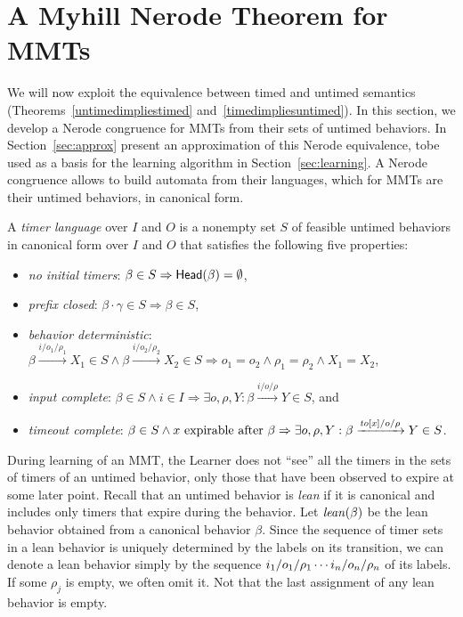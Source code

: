 \section{A Myhill Nerode Theorem for MMTs}
\label{sec:nerode}
\label{sec:bj-nerode}

We will now exploit the equivalence between timed and untimed semantics
(Theorems~\ref{untimedimpliestimed} and~\ref{timedimpliesuntimed}).
In this section, we develop a Nerode congruence for  MMTs
from their sets of untimed behaviors.
In Section~\ref{sec:approx} present an approximation of this
Nerode equivalence, tobe used as a basis for the learning algorithm in
Section~\ref{sec:learning}.
  A Nerode congruence allows to build automata from their languages, which for MMTs are their untimed behaviors, in canonical form.

\begin{definition}
\label{def:timer language}
A \emph{timer language} over $I$ and $O$ is a nonempty set 
$S$ of feasible untimed behaviors in canonical form over $I$ and $O$ that satisfies the following five properties:
\begin{itemize}
\item
\emph{no initial timers}: $\beta \in S \Rightarrow \mathsf{Head}({\beta}) = \emptyset$,
\item
\emph{prefix closed}: $\beta \cdot \gamma \in S \Rightarrow \beta \in S$,
\item
\emph{behavior deterministic}:
$\beta \xrightarrow{i/o_1/\rho_1} X_1 \in S \wedge \beta \xrightarrow{i/o_2/\rho_2} X_2 \in S \Rightarrow o_1 = o_2 \wedge \rho_1 = \rho_2 \wedge X_1 = X_2$,
\item
\emph{input complete}:
$\beta \in S \wedge i \in I \Rightarrow \exists o, \rho, Y : \beta \xrightarrow{i/o/\rho} Y \in S$,
and
\item
\emph{timeout complete}:
$\beta \in S \wedge x \mbox{ expirable after } \beta \Rightarrow
\exists o, \rho, Y: \beta \xrightarrow{\mathit{to}[x]/o/\rho} Y \in S$.
\end{itemize}
\end{definition}

During learning of an MMT, the Learner does not ``see'' all the timers
in the sets of timers of an untimed behavior, only those that have
been observed to expire at some later point. 
Recall that an untimed behavior is {\em lean} if it is canonical and
includes only timers that expire during the behavior.
Let $\mathit{lean}({\beta})$ be the lean behavior obtained from a canonical
behavior $\beta$.
Since the sequence of timer sets in a lean behavior is
uniquely determined by the labels on its transition, we can
denote a lean behavior simply by the sequence
$i_1/o_1/\rho_1 \cdots i_n/o_n/\rho_n$ of its labels.
If some $\rho_j$ is empty, we often omit it. Not that
the last assignment of any lean behavior is empty.


